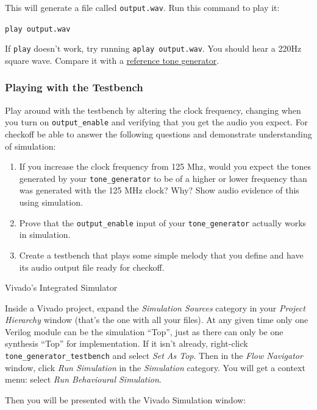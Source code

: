 \documentclass[11pt]{article}
\makeatletter
\renewcommand{\subsection}
{\@startsection {subsection}{1}{0pt}
 {-1ex}
 {0.5ex}
 {\bfseries\normalsize}}
\makeatother
\begin{document}
This will generate a file called \verb|output.wav|. Run this command to play it:

\verb|play output.wav|

If \verb|play| doesn't work, try running \verb|aplay output.wav|.
You should hear a 220Hz square wave. Compare it with a \href{https://www.szynalski.com/tone-generator/}{reference tone generator}.

\subsubsection{Playing with the Testbench} \label{checkoff:0}

Play around with the testbench by altering the clock frequency, changing when you turn on \verb|output_enable| and verifying that you get the audio you expect. For checkoff be able to answer the following questions and demonstrate understanding of simulation:

\begin{enumerate}
	\item If you increase the clock frequency from 125 Mhz, would you expect the tones generated by your \verb|tone_generator| to be of a higher or lower frequency than was generated with the 125 MHz clock? Why? Show audio evidence of this using simulation.
	\item Prove that the \verb|output_enable| input of your \verb|tone_generator| actually works in simulation.
	\item Create a testbench that plays some simple melody that you define and have its audio output file ready for checkoff.
\end{enumerate}

\subsection{Vivado's Integrated Simulator}

Inside a Vivado project, expand the \emph{Simulation Sources} category in your \emph{Project Hierarchy} window (that's the one with all your files). At any given time only one Verilog module can be the simulation ``Top'', just as there can only be one synthesis ``Top'' for implementation. If it isn't already, right-click \verb|tone_generator_testbench| and select \emph{Set As Top}. Then in the \emph{Flow Navigator} window, click \emph{Run Simulation} in the \emph{Simulation} category. You will get a context menu: select \emph{Run Behavioural Simulation}.

Then you will be presented with the Vivado Simulation window:
\end{document}
